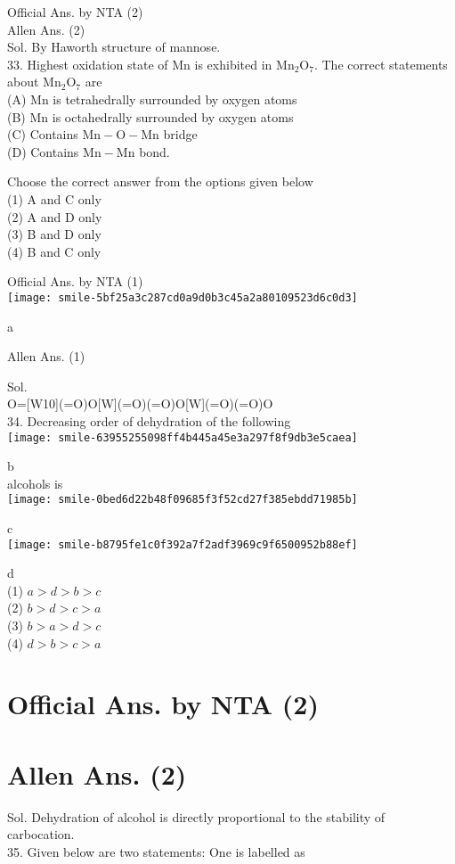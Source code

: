 \documentclass[10pt]{article}
\begin{document}
Official Ans. by NTA (2)\\
Allen Ans. (2)\\
Sol. By Haworth structure of mannose.\\
33. Highest oxidation state of Mn is exhibited in \(\mathrm{Mn}_{2} \mathrm{O}_{7}\). The correct statements about \(\mathrm{Mn}_{2} \mathrm{O}_{7}\) are\\
(A) Mn is tetrahedrally surrounded by oxygen atoms\\
(B) Mn is octahedrally surrounded by oxygen atoms\\
(C) Contains \(\mathrm{Mn}-\mathrm{O}-\mathrm{Mn}\) bridge\\
(D) Contains \(\mathrm{Mn}-\mathrm{Mn}\) bond.

Choose the correct answer from the options given below\\
(1) A and C only\\
(2) A and D only\\
(3) B and D only\\
(4) B and C only

Official Ans. by NTA (1)\\
\texttt{[image: smile-5bf25a3c287cd0a9d0b3c45a2a80109523d6c0d3]}

a

Allen Ans. (1)

Sol.\\
\textnormal{O=[W10](=O)O[W](=O)(=O)O[W](=O)(=O)O}\\
34. Decreasing order of dehydration of the following\\
\texttt{[image: smile-63955255098ff4b445a45e3a297f8f9db3e5caea]}

b\\
alcohols is\\
\texttt{[image: smile-0bed6d22b48f09685f3f52cd27f385ebdd71985b]}

c\\
\texttt{[image: smile-b8795fe1c0f392a7f2adf3969c9f6500952b88ef]}

d\\
(1) \(a>d>b>c\)\\
(2) \(b>d>c>a\)\\
(3) \(b>a>d>c\)\\
(4) \(d>b>c>a\)

\section*{Official Ans. by NTA (2)}
\section*{Allen Ans. (2)}
Sol. Dehydration of alcohol is directly proportional to the stability of carbocation.\\
35. Given below are two statements: One is labelled as
\end{document}
